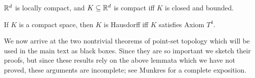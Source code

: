 \begin{theorem}
$\mathbb{R}^d$ is locally compact, and $K \subseteq \mathbb{R}^d$ is compact iff $K$ is closed and bounded.
\end{theorem}

\begin{lemma}
If $K$ is a compact space, then $K$ is Hausdorff iff $K$ satisfies Axiom $T^4$.
\end{lemma}

\begin{subsec}
We now arrive at the two nontrivial theorems of point-set topology which will be used in the main text as black boxes.
Since they are so important we sketch their proofs, but since these results rely on the above lemmata which we have not proved, these arguments are incomplete; see Munkres \cite{munkres2000topology} for a complete exposition.
\end{subsec}

